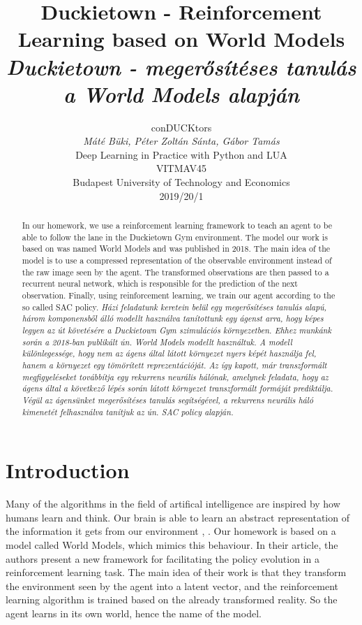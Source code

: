 \documentclass{article}
\title{Duckietown - Reinforcement Learning based on World Models\\ \textit{Duckietown - megerősítéses tanulás a World Models alapján}}
\author{%
  conDUCKtors\\
  \textit{Máté Büki, Péter Zoltán Sánta, Gábor Tamás}\\
  Deep Learning in Practice with Python and LUA\\
  VITMAV45\\
  Budapest University of Technology and Economics \\
  2019/20/1
}
\begin{document}
\maketitle

\begin{abstract}
  In our homework, we use a reinforcement learning framework to teach an agent to be able to follow the lane in the Duckietown Gym environment. The model our work is based on was named World Models \cite{worldmodels} and was published in 2018. The main idea of the model is to use a compressed representation of the observable environment instead of the raw image seen by the agent. The transformed observations are then passed to a recurrent neural network, which is responsible for the prediction of the next observation. Finally, using reinforcement learning, we train our agent according to the so called SAC policy.\newline
  \textit{Házi feladatunk keretein belül egy megerősítéses tanulás alapú, három komponensből álló modellt használva tanítottunk egy ágenst arra, hogy képes legyen az út követésére a Duckietown Gym szimulációs környezetben. Ehhez munkánk során a 2018-ban publikált ún. World Models\cite{worldmodels} modellt használtuk. A modell különlegessége, hogy nem az ágens által látott környezet nyers képét használja fel, hanem a környezet egy tömörített reprezentációját. Az így kapott, már transzformált megfigyeléseket továbbítja egy rekurrens neurális hálónak, amelynek feladata, hogy az ágens által a következő lépés során látott környezet transzformált formáját prediktálja. Végül az ágensünket megerősítéses tanulás segítségével, a rekurrens neurális háló kimenetét felhasználva tanítjuk az ún. SAC policy alapján.}
\end{abstract}

\section{Introduction}

Many of the algorithms in the field of artifical intelligence are inspired by how humans learn and think. Our brain is able to learn an abstract representation of the information it gets from our environment \cite{brain1}, \cite{brain2}. Our homework is based on a model called World Models\cite{worldmodels}, which mimics this behaviour. In their article, the authors present a new framework for facilitating the policy evolution in a reinforcement learning task. The main idea of their work is that they transform the environment seen by the agent into a latent vector, and the reinforcement learning algorithm is trained based on the already transformed reality. So the agent learns in its own world, hence the name of the model.
\end{document}
